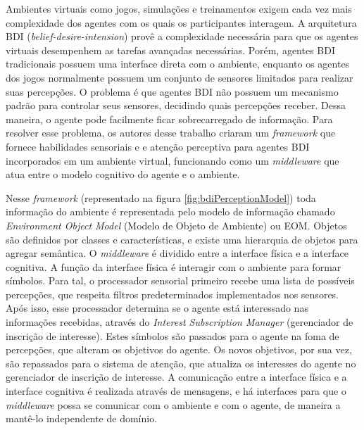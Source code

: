 \label{van2011}
Ambientes virtuais como jogos, simulações e treinamentos exigem cada vez mais complexidade dos agentes com os quais os participantes interagem. A arquitetura BDI (\textit{belief-desire-intension}) provê a complexidade necessária para que os agentes virtuais desempenhem as tarefas avançadas necessárias. Porém, agentes BDI tradicionais possuem uma interface direta com o ambiente, enquanto os agentes dos jogos normalmente possuem um conjunto de sensores limitados para realizar suas percepções. O problema é que agentes BDI não possuem um mecanismo padrão para controlar seus sensores, decidindo quais percepções receber. Dessa maneira, o agente pode facilmente ficar sobrecarregado de informação. Para resolver esse problema, os autores desse trabalho criaram um \textit{framework} que fornece habilidades sensoriais e e atenção perceptiva para agentes BDI incorporados em um ambiente virtual, funcionando como um \textit{middleware} que atua entre o modelo cognitivo do agente e o ambiente.

Nesse \textit{framework} (representado na figura \ref{fig:bdiPerceptionModel}) toda informação do ambiente é representada pelo modelo de informação chamado \textit{Environment Object Model} (Modelo de Objeto de Ambiente) ou EOM. Objetos são definidos por classes e características, e existe uma hierarquia de objetos para agregar semântica. O \textit{middleware} é dividido entre a interface física e a interface cognitiva. A função da interface física é interagir com o ambiente para formar símbolos. Para tal, o processador sensorial primeiro recebe uma lista de possíveis percepções, que respeita filtros predeterminados implementados nos sensores. Após isso, esse processador determina se o agente está interessado nas informações recebidas, através do \textit{Interest Subscription Manager} (gerenciador de inscrição de interesse). Estes símbolos são passados para o agente na foma de percepções, que alteram os objetivos do agente. Os novos objetivos, por sua vez, são repassados para o sistema de atenção, que atualiza os interesses do agente no gerenciador de inscrição de interesse. A comunicação entre a interface física e a interface cognitiva é realizada através de mensagens, e há interfaces para que o \textit{middleware} possa se comunicar com o ambiente e com o agente, de maneira a mantê-lo independente de domínio. 

